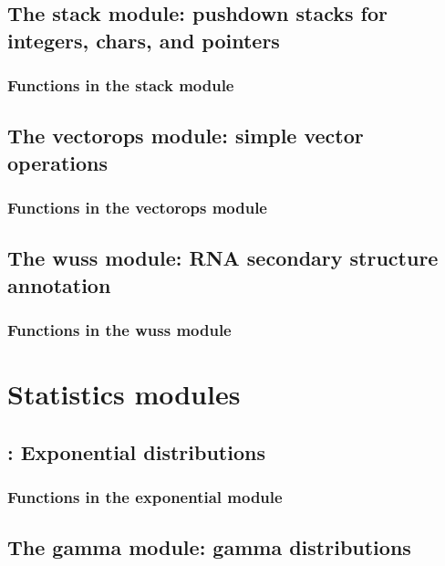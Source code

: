 \documentclass[11pt]{book}
\begin{document}
\newpage
\section{The stack module: pushdown stacks for integers, chars, and pointers}

\subsection{Functions in the stack module}


\newpage
\section{The vectorops module: simple vector operations}

\subsection{Functions in the vectorops module}


\newpage
\section{The wuss module: RNA secondary structure annotation}

\subsection{Functions in the wuss module}



\newpage
\chapter{Statistics modules}


\newpage
\section{: Exponential distributions}

\subsection{Functions in the exponential module}


\newpage
\section{The gamma module: gamma distributions}

\end{document}
